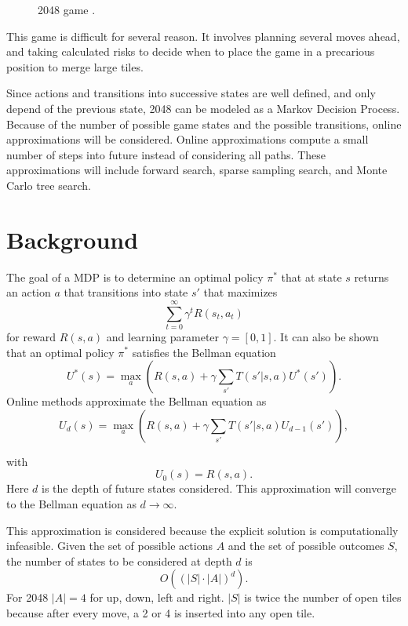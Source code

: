 \documentclass[conference]{IEEEtran}
\begin{document}
\begin{figure}[htbp]
\caption{2048 game \cite{2048}.}
\label{fig}
\end{figure}

This game is difficult for several reason. It involves planning several moves ahead, and taking calculated risks to decide when to place the game in a precarious position to merge large tiles.

Since actions and transitions into successive states are well defined, and only depend of the previous state, 2048 can be modeled as a Markov Decision Process. Because of the number of possible game states and the possible transitions, online approximations will be considered.
Online approximations compute a small number of steps into future instead of considering all paths. These approximations will include forward search, sparse sampling search, and Monte Carlo tree search.

\section{Background}

The goal of a MDP is to determine an optimal policy $\pi^*$ that at state $s$ returns an action $a$ that transitions into state $s'$ that maximizes
$$\sum_{t=0}^\infty \gamma^t R(s_t,a_t)$$
for reward $R(s,a)$ and learning parameter $\gamma = [0,1].$
It can also be shown that an optimal policy $\pi^*$ satisfies the Bellman equation \cite{d}
\begin{equation}
	U^*(s) = \max_a \left( R(s,a)  + \gamma\sum_{s'}T(s'|s,a)U^*(s')\right).
\end{equation}
Online methods approximate the Bellman equation as \cite{d}
\begin{equation}
	U_d(s) = \max_a \left( R(s,a)  + \gamma\sum_{s'}T(s'|s,a)U_{d-1}(s')\right),
\end{equation}

with 
$$U_0(s) = R(s,a).$$
Here $d$ is the depth of future states considered. This approximation will converge to the Bellman equation as $d \rightarrow \infty$\cite{d}.

This approximation is considered because the explicit solution is computationally infeasible. Given the set of possible actions $A$ and the set of possible outcomes $S$, the number of states to be considered at depth $d$ is 
$$O((|S| \cdot |A|)^d).$$
For 2048 $|A|=4$ for up, down, left and right. $|S|$ is twice the number of open tiles because after every move, a 2 or 4 is inserted into any open tile.
\end{document}
